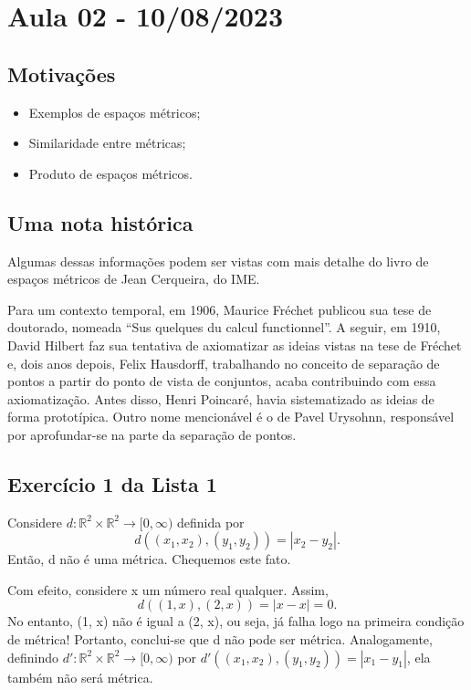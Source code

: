\documentclass[metric_notes.tex]{subfiles}
\begin{document}
\section{Aula 02 - 10/08/2023}
\subsection{Motivações}
\begin{itemize}
	\item Exemplos de espaços métricos;
	\item Similaridade entre métricas;
	\item Produto de espaços métricos.
\end{itemize}
\subsection{Uma nota histórica}
Algumas dessas informações podem ser vistas com mais detalhe do livro de espaços métricos
de Jean Cerqueira, do IME.

Para um contexto temporal, em 1906, Maurice Fréchet publicou sua tese de doutorado, nomeada
``Sus quelques du calcul functionnel''. A seguir, em 1910, David Hilbert faz sua tentativa de axiomatizar
as ideias vistas na tese de Fréchet e, dois anos depois, Felix Hausdorff, trabalhando no conceito de separação de pontos
a partir do ponto de vista de conjuntos, acaba contribuindo com essa axiomatização. Antes disso, Henri Poincaré, havia sistematizado as ideias
de forma prototípica. Outro nome mencionável é o de Pavel Urysohnn, responsável por aprofundar-se na parte da separação de pontos.

\subsection{Exercício 1 da Lista 1}
Considere \(d:\mathbb{R}^{2}\times \mathbb{R}^{2}\rightarrow [0, \infty) \) definida por
\[
	d((x_{1}, x_{2}), (y_{1}, y_{2})) = |x_{2}-y_{2}|.
\]
Então, d não é uma métrica. Chequemos este fato.

Com efeito, considere x um número real qualquer. Assim,
\[
	d((1, x), (2, x)) = |x-x| = 0.
\]
No entanto, (1, x) não é igual a (2, x), ou seja, já falha logo na primeira condição de métrica!
Portanto, conclui-se que d não pode ser métrica. Analogamente, definindo \(d':\mathbb{R}^{2}\times \mathbb{R}^{2}\rightarrow [0, \infty)\) por
\(d'((x_{1}, x_{2}), (y_{1}, y_{2}))=|x_{1}-y_{1}|\), ela também não será métrica.
\end{document}
